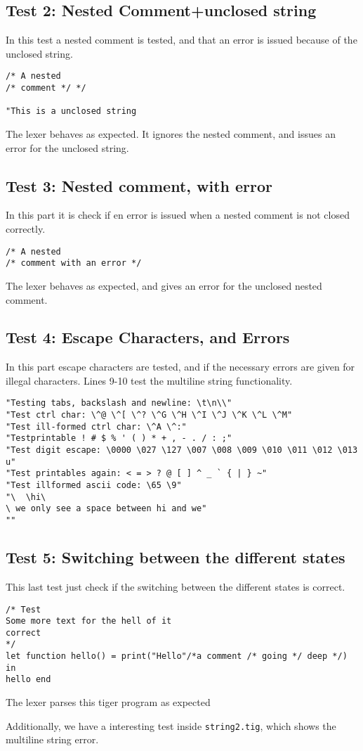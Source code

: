 \documentclass{article}
\begin{document}
\subsection{Test 2: Nested Comment+unclosed string}
In this test a nested comment is tested, and that an error is issued because of the unclosed string.

\begin{lstlisting}[frame=single]
/* A nested
/* comment */ */

"This is a unclosed string
\end{lstlisting}

The lexer behaves as expected. It ignores the nested comment, and issues an error for the unclosed string.

\subsection{Test 3: Nested comment, with error}
In this part it is check if en error is issued when a nested comment is not closed correctly.

\begin{lstlisting}[frame=single]
/* A nested
/* comment with an error */ 

\end{lstlisting}

The lexer behaves as expected, and gives an error for the unclosed nested comment.

\subsection{Test 4: Escape Characters, and Errors}
In this part escape characters are tested, and if the necessary errors are given for illegal characters.
Lines 9-10 test the multiline string functionality.


\begin{lstlisting}[frame=single]
"Testing tabs, backslash and newline: \t\n\\"
"Test ctrl char: \^@ \^[ \^? \^G \^H \^I \^J \^K \^L \^M"
"Test ill-formed ctrl char: \^A \^:"
"Testprintable ! # $ % ' ( ) * + , - . / : ;"
"Test digit escape: \0000 \027 \127 \007 \008 \009 \010 \011 \012 \013 u"
"Test printables again: < = > ? @ [ ] ^ _ ` { | } ~"
"Test illformed ascii code: \65 \9"
"\	\hi\
\ we only see a space between hi and we"
""
\end{lstlisting}

\subsection{Test 5: Switching between the different states}
This last test just check if the switching between the different states is correct.

\begin{lstlisting}[frame=single]
/* Test 
Some more text for the hell of it
correct
*/
let function hello() = print("Hello"/*a comment /* going */ deep */) in 
hello end
\end{lstlisting}
The lexer parses this tiger program as expected

Additionally, we have a interesting test inside \texttt{string2.tig}, which shows the multiline string error.
\end{document}
